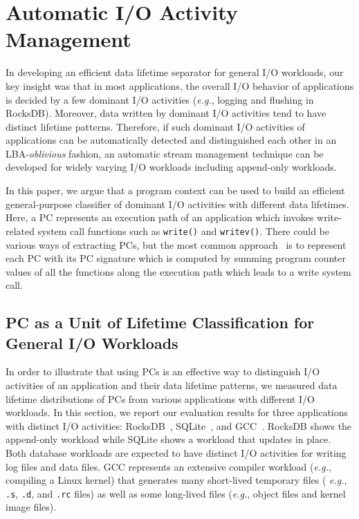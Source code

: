 \section{Automatic I/O Activity Management}
\label{sec:programcontext}
In developing an efficient data lifetime separator for general I/O workloads,
our key insight was that in most applications, the overall I/O behavior of
applications is decided by a few dominant I/O activities ({\it e.g.}, logging and
flushing in RocksDB).  Moreover, data written by dominant I/O activities tend
to have distinct lifetime patterns.  Therefore, if such dominant I/O activities
of applications can be automatically detected and distinguished each other in
an LBA-{\it oblivious} fashion, an automatic stream management technique can be
developed for widely varying I/O workloads including append-only workloads.

In this paper, we argue that a program context can be used to build an
efficient general-purpose classifier of dominant I/O activities with different
data lifetimes.  Here, a PC represents an execution path of an application
which invokes write-related system call functions such as {\tt write()} and
{\tt writev()}.  There could be various ways of extracting PCs, but the most
common approach~\cite{PC, PC2} is to represent each PC with its PC signature
which is computed by summing program counter values of all the functions along
the execution path which leads to a write system call.


\subsection{PC as a Unit of Lifetime Classification for General I/O Workloads}
In order to illustrate that using PCs is an effective way to distinguish I/O
activities of an application and their data lifetime patterns, we measured data
lifetime distributions of PCs from various applications with different I/O
workloads.  In this section, we report our evaluation results for three
applications with distinct I/O activities: RocksDB~\cite{RocksDB},
SQLite~\cite{SQLite}, and GCC~\cite{GCC}.  RocksDB shows the append-only
workload while SQLite shows a workload that updates in place.  Both database
workloads are expected to have distinct I/O activities for writing log files
and data files.  GCC represents an extensive compiler workload ({\it e.g.},
compiling a Linux kernel) that generates many short-lived temporary files ({\it
e.g.}, \texttt{.s}, \texttt{.d}, and \texttt{.rc} files) as well as some
long-lived files ({\it e.g.}, object files and kernel image files).

